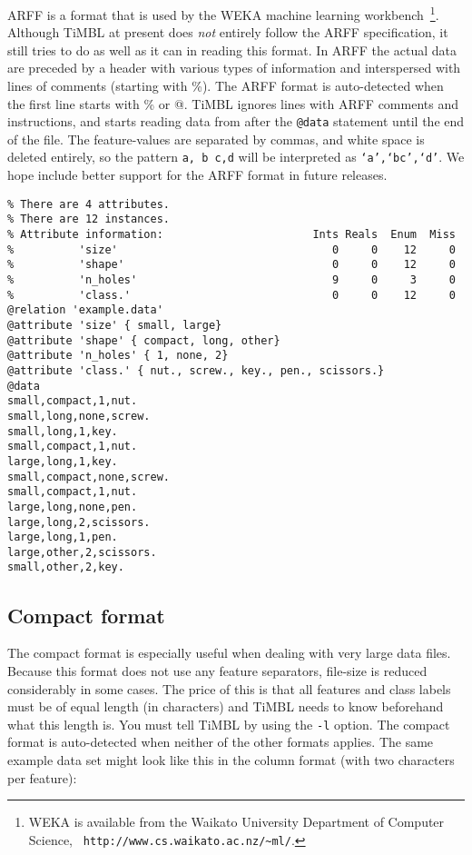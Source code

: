 \documentclass{report}
\begin{document}
ARFF is a format that is used by the WEKA machine learning
workbench~\cite{Garner95}\footnote{WEKA is available from the Waikato
University Department of Computer Science, {\tt
http://www.cs.waikato.ac.nz/\~{}ml/}.}.  Although TiMBL at present
does {\em not} entirely follow the ARFF specification, it still tries to do
as well as it can in reading this format. In ARFF the actual data are
preceded by a header with various types of information and
interspersed with lines of comments (starting with \%). The ARFF
format is auto-detected when the first line starts with \% or @. TiMBL
ignores lines with ARFF comments and instructions, and starts reading
data from after the {\tt @data} statement until the end of the
file. The feature-values are separated by commas, and white space is
deleted entirely, so the pattern {\tt a, b c,d} will be interpreted as
{\tt `a',`bc',`d'}. We hope include better support for the
ARFF format in future releases.

\begin{verbatim}
% There are 4 attributes.
% There are 12 instances.
% Attribute information:                       Ints Reals  Enum  Miss
%          'size'                                 0     0    12     0   
%          'shape'                                0     0    12     0   
%          'n_holes'                              9     0     3     0   
%          'class.'                               0     0    12     0   
@relation 'example.data'
@attribute 'size' { small, large}
@attribute 'shape' { compact, long, other}
@attribute 'n_holes' { 1, none, 2}
@attribute 'class.' { nut., screw., key., pen., scissors.}
@data
small,compact,1,nut.
small,long,none,screw.
small,long,1,key.
small,compact,1,nut.
large,long,1,key.
small,compact,none,screw.
small,compact,1,nut.
large,long,none,pen.
large,long,2,scissors.
large,long,1,pen.
large,other,2,scissors.
small,other,2,key.
\end{verbatim}

\subsection{Compact format}
\label{compactformat}

The compact format is especially useful when dealing with very large
data files. Because this format does not use any feature separators,
file-size is reduced considerably in some cases. The price of this is
that all features and class labels must be of equal length (in
characters) and TiMBL needs to know beforehand what this length
is. You must tell TiMBL by using the {\tt -l} option. The compact
format is auto-detected when neither of the other formats applies. The
same example data set might look like this in the column format (with
two characters per feature):
\end{document}
